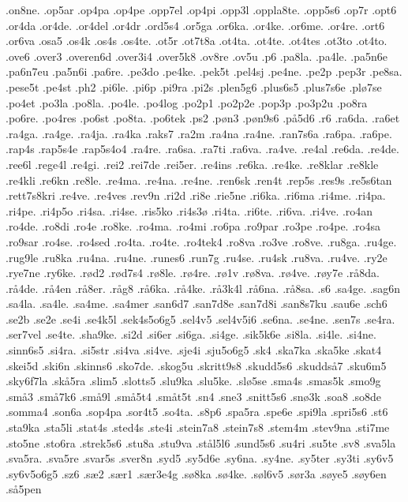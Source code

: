 {.on8ne.
.op5ar
.op4pa
.op4pe
.opp7el
.op4pi
.opp3l
.oppla8te.
.opp5s6
.op7r
.opt6
.or4da
.or4de.
.or4del
.or4dr
.ord5s4
.or5ga
.or6ka.
.or4ke.
.or6me.
.or4re.
.ort6
.or6va
.osa5
.os4k
.os4s
.os4te.
.ot5r
.ot7t8a
.ot4ta.
.ot4te.
.ot4tes
.ot3to
.ot4to.
.ove6
.over3
.overen6d
.over3i4
.over5k8
.ov8re
.ov5u
.p6
.pa8la.
.pa4le.
.pa5n6e
.pa6n7eu
.pa5n6i
.pa6re.
.pe3do
.pe4ke.
.pek5t
.pel4sj
.pe4ne.
.pe2p
.pep3r
.pe8sa.
.pese5t
.pe4st
.ph2
.pi6le.
.pi6p
.pi9ra
.pi2s
.plen5g6
.plus6s5
.plus7s6e
.plø7se
.po4et
.po3la
.po8la.
.po4le.
.po4log
.po2p1
.po2p2e
.pop3p
.po3p2u
.po8ra
.po6re.
.po4res
.po6st
.po8ta.
.po6tek
.ps2
.pøn3
.pøn9s6
.på5d6
.r6
.ra6da.
.ra6et
.ra4ga.
.ra4ge.
.ra4ja.
.ra4ka
.raks7
.ra2m
.ra4na
.ra4ne.
.ran7s6a
.ra6pa.
.ra6pe.
.rap4s
.rap5s4e
.rap5s4o4
.ra4re.
.ra6sa.
.ra7ti
.ra6va.
.ra4ve.
.re4al
.re6da.
.re4de.
.ree6l
.rege4l
.re4gi.
.rei2
.rei7de
.rei5er.
.re4ins
.re6ka.
.re4ke.
.re8klar
.re8kle
.re4kli
.re6kn
.re8le.
.re4ma.
.re4na.
.re4ne.
.ren6sk
.ren4t
.rep5s
.res9s
.re5s6tan
.rett7s8kri
.re4ve.
.re4ves
.rev9n
.ri2d
.ri8e
.rie5ne
.ri6ka.
.ri6ma
.ri4me.
.ri4pa.
.ri4pe.
.ri4p5o
.ri4sa.
.ri4se.
.ris5ko
.ri4s3ø
.ri4ta.
.ri6te.
.ri6va.
.ri4ve.
.ro4an
.ro4de.
.ro8di
.ro4e
.ro8ke.
.ro4ma.
.ro4mi
.ro6pa
.ro9par
.ro3pe
.ro4pe.
.ro4sa
.ro9sar
.ro4se.
.ro4sed
.ro4ta.
.ro4te.
.ro4tek4
.ro8va
.ro3ve
.ro8ve.
.ru8ga.
.ru4ge.
.rug9le
.ru8ka
.ru4na.
.ru4ne.
.runes6
.run7g
.ru4se.
.ru4sk
.ru8va.
.ru4ve.
.ry2e
.rye7ne
.ry6ke.
.rød2
.rød7s4
.rø8le.
.rø4re.
.rø1v
.rø8va.
.rø4ve.
.røy7e
.rå8da.
.rå4de.
.rå4en
.rå8er.
.råg8
.rå6ka.
.rå4ke.
.rå3k4l
.rå6na.
.rå8sa.
.s6
.sa4ge.
.sag6n
.sa4la.
.sa4le.
.sa4me.
.sa4mer
.san6d7
.san7d8e
.san7d8i
.san8s7ku
.sau6e
.sch6
.se2b
.se2e
.se4i
.se4k5l
.sek4s5o6g5
.sel4v5
.sel4v5i6
.se6na.
.se4ne.
.sen7s
.se4ra.
.ser7vel
.se4te.
.sha9ke.
.si2d
.si6er
.si6ga.
.si4ge.
.sik5k6e
.si8la.
.si4le.
.si4ne.
.sinn6s5
.si4ra.
.si5str
.si4va
.si4ve.
.sje4i
.sju5o6g5
.sk4
.ska7ka
.ska5ke
.skat4
.skei5d
.ski6n
.skinns6
.sko7de.
.skog5u
.skritt9s8
.skudd5s6
.skuddså7
.sku6m5
.sky6f7la
.skå5ra
.slim5
.slotts5
.slu9ka
.slu5ke.
.slø5se
.sma4s
.smas5k
.smo9g
.små3
.små7k6
.små9l
.små5t4
.småt5t
.sn4
.sne3
.snitt5s6
.snø3k
.soa8
.so8de
.somma4
.son6a
.sop4pa
.sor4t5
.so4ta.
.s8p6
.spa5ra
.spe6e
.spi9la
.spri5s6
.st6
.sta9ka
.sta5li
.stat4s
.sted4s
.ste4i
.stein7a8
.stein7s8
.stem4m
.stev9na
.sti7me
.sto5ne
.sto6ra
.strek5s6
.stu8a
.stu9va
.stål5l6
.sund5s6
.su4ri
.su5te
.sv8
.sva5la
.sva5ra.
.sva5re
.svar5s
.sver8n
.syd5
.sy5d6e
.sy6na.
.sy4ne.
.sy5ter
.sy3ti
.sy6v5
.sy6v5o6g5
.sz6
.sæ2
.sær1
.sær3e4g
.sø8ka
.sø4ke.
.søl6v5
.sør3a
.søye5
.søy6en
.så5pen
}

